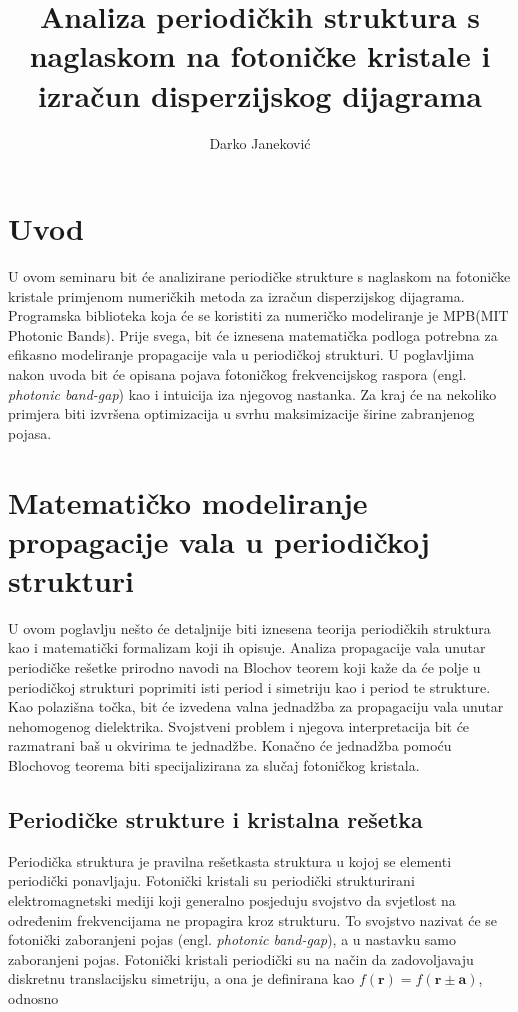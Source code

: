 \documentclass[utf8, seminar, numeric]{fer}
\begin{document}
\title{Analiza periodičkih struktura s naglaskom na fotoničke kristale
	   i izračun disperzijskog dijagrama}
\author{Darko Janeković}

\maketitle

\tableofcontents


\chapter{Uvod}
U ovom seminaru bit će analizirane periodičke strukture s naglaskom na fotoničke
kristale primjenom numeričkih metoda za izračun disperzijskog dijagrama.
Programska biblioteka koja će se koristiti za numeričko modeliranje je
MPB(MIT Photonic Bands)\cite{Johnson2001:mpb}. Prije svega, bit će iznesena
matematička podloga potrebna za efikasno modeliranje propagacije vala u
periodičkoj strukturi. U poglavljima nakon uvoda bit će opisana pojava fotoničkog
frekvencijskog raspora (engl. \textit{photonic band-gap}) kao i intuicija iza
njegovog nastanka. Za kraj će na nekoliko primjera biti izvršena optimizacija u
svrhu maksimizacije širine zabranjenog pojasa.


\chapter{Matematičko modeliranje propagacije vala u periodičkoj strukturi}

U ovom poglavlju nešto će detaljnije biti iznesena teorija periodičkih struktura
kao i matematički formalizam koji ih opisuje. Analiza propagacije vala unutar
periodičke rešetke prirodno navodi na Blochov teorem koji kaže da će polje u
periodičkoj strukturi poprimiti isti period i simetriju kao i period te strukture.
Kao polazišna točka, bit će izvedena valna jednadžba za propagaciju vala unutar
nehomogenog dielektrika. Svojstveni problem i njegova interpretacija bit će
razmatrani baš u okvirima te jednadžbe. Konačno će jednadžba pomoću Blochovog
teorema biti specijalizirana za slučaj fotoničkog kristala.


\section{Periodičke strukture i kristalna rešetka}

Periodička struktura je pravilna rešetkasta struktura u kojoj se elementi
periodički ponavljaju. Fotonički kristali su periodički strukturirani
elektromagnetski mediji koji generalno posjeduju svojstvo da svjetlost na
određenim frekvencijama ne propagira kroz strukturu. To svojstvo nazivat će se
fotonički zaboranjeni pojas (engl. \textit{photonic band-gap}), a u nastavku
samo zaboranjeni pojas. Fotonički kristali periodički su na način da
zadovoljavaju diskretnu translacijsku simetriju, a ona je definirana kao
${f(\mathbf{r}) = f(\mathbf{r} \pm \mathbf{a})}$, odnosno
\end{document}
